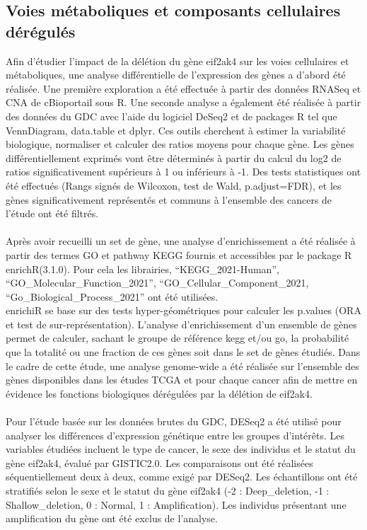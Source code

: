 \documentclass{style}
\begin{document}
\subsection{Voies métaboliques et composants cellulaires dérégulés}
Afin d'étudier l’impact de la délétion du gène eif2ak4 sur les voies cellulaires et métaboliques, une analyse différentielle de l'expression des gènes a  d’abord été réalisée. Une première exploration a été effectuée à partir des données RNASeq et CNA de cBioportail sous R. Une seconde analyse a également été réalisée à partir des données du GDC avec l’aide du logiciel DeSeq2 et de packages R tel que VennDiagram, data.table et dplyr. Ces outils cherchent à estimer la variabilité biologique, normaliser et calculer des ratios moyens pour chaque gène. Les gènes différentiellement exprimés vont être déterminés à partir du calcul du log2 de ratios significativement supérieurs à 1 ou inférieurs à -1. Des tests statistiques ont été effectués (Rangs signés de Wilcoxon, test de Wald, p.adjust=FDR), et les gènes significativement représentés et communs à l’ensemble des cancers de l’étude ont été filtrés. \\ \\
Après avoir recueilli un set de gène, une analyse d'enrichissement a été réalisée à partir des termes GO et pathway KEGG fournis et accessibles par le package R enrichR(3.1.0). Pour cela les librairies, “KEGG\_2021-Human”, “GO\_Molecular\_Function\_2021”, “GO\_Cellular\_Component\_2021, “Go\_Biological\_Process\_2021” ont été utilisées. \\enrichiR se base sur des tests hyper-géométriques pour calculer les p.values (ORA et test de sur-représentation). L'analyse d'enrichissement d'un ensemble de gènes permet de calculer, sachant le groupe de référence \acrshort{kegg} et/ou \acrshort{go}, la probabilité que la totalité ou une fraction de ces gènes soit dans le set de gènes étudiés. Dans le cadre de cette étude, une analyse genome-wide a été réalisée sur l’ensemble des gènes disponibles dans les études TCGA et pour chaque cancer afin de mettre en évidence les fonctions biologiques dérégulées par la délétion de eif2ak4. \\ \\
Pour l’étude basée sur les données brutes du GDC, DESeq2 a été utilisé pour analyser les différences d'expression génétique entre les groupes d'intérêts. Les variables étudiées incluent le type de cancer, le sexe des individus et le statut du gène eif2ak4, évalué par GISTIC2.0. Les comparaisons ont été réalisées séquentiellement deux à deux, comme exigé par DESeq2. Les échantillons ont été stratifiés selon le sexe et le statut du gène eif2ak4 (-2 : Deep\_deletion, -1 : Shallow\_deletion, 0 : Normal, 1 : Amplification). Les individus présentant une amplification du gène ont été exclus de l'analyse. \\
\end{document}
